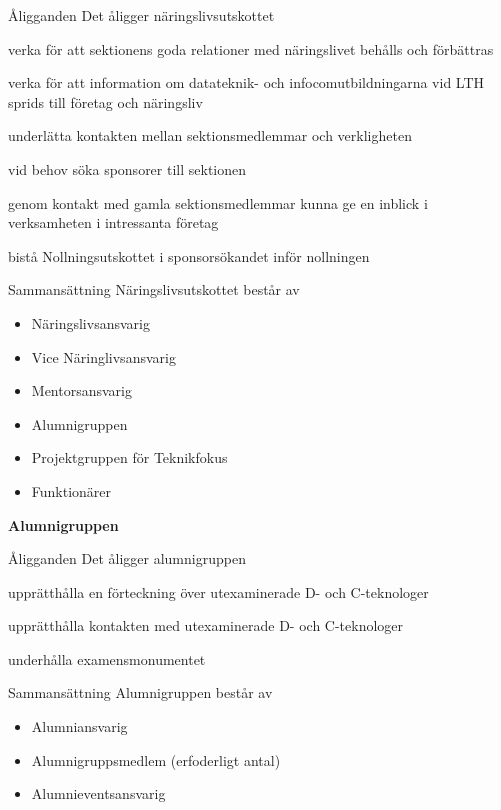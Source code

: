 \documentclass[pdfbookmarks,a4paper,11pt]{article}
\newlength{\itemcollength}
\newenvironment{reglemlista}{%
  \begin{list}{}{%
      \setlength{\labelwidth}{\itemcollength}%
      \setlength{\leftmargin}{\labelwidth + \labelsep}%
      \renewcommand{\makelabel}[1]{%
        \raisebox{0pt}[1ex][0pt]{%
          \makebox[\labelwidth][l]{%
            \parbox[t]{\itemcollength}{%
              \raggedright\hspace{0pt}##1}}}\hfill}%
      }}{%
  \end{list}}
\begin{document}
\begin{reglemlista}

	\item[Åligganden]
	Det åligger näringslivsutskottet
	\begin{attlista}
		\item verka för att sektionens goda relationer med näringslivet behålls och förbättras
		\item verka för att information om datateknik- och infocomutbildningarna vid LTH sprids till företag och näringsliv
		\item underlätta kontakten mellan sektionsmedlemmar och verkligheten
		\item vid behov söka sponsorer till sektionen
		\item genom kontakt med gamla sektionsmedlemmar kunna ge en inblick i verksamheten i intressanta företag
		\item bistå Nollningsutskottet i sponsorsökandet inför nollningen
	\end{attlista}

	\item[Sammansättning]
	Näringslivsutskottet består av
	\begin{itemize}
		\item Näringslivsansvarig
		\item Vice Näringlivsansvarig
		\item Mentorsansvarig
		\item Alumnigruppen
		\item Projektgruppen för Teknikfokus
		\item Funktionärer
	\end{itemize}

	\item[\textbf{Alumnigruppen}]

	\item[Åligganden]
	Det åligger alumnigruppen
	\begin{attlista}
		\item  upprätthålla en förteckning över utexaminerade D- och C-teknologer
		\item upprätthålla kontakten med utexaminerade D- och C-teknologer
		\item underhålla examensmonumentet
	\end{attlista}

	\item[Sammansättning]
	Alumnigruppen består av
	\begin{itemize}
		\item Alumniansvarig
		\item Alumnigruppsmedlem (erfoderligt antal)
		\item Alumnieventsansvarig
	\end{itemize}

\end{reglemlista}
\end{document}
